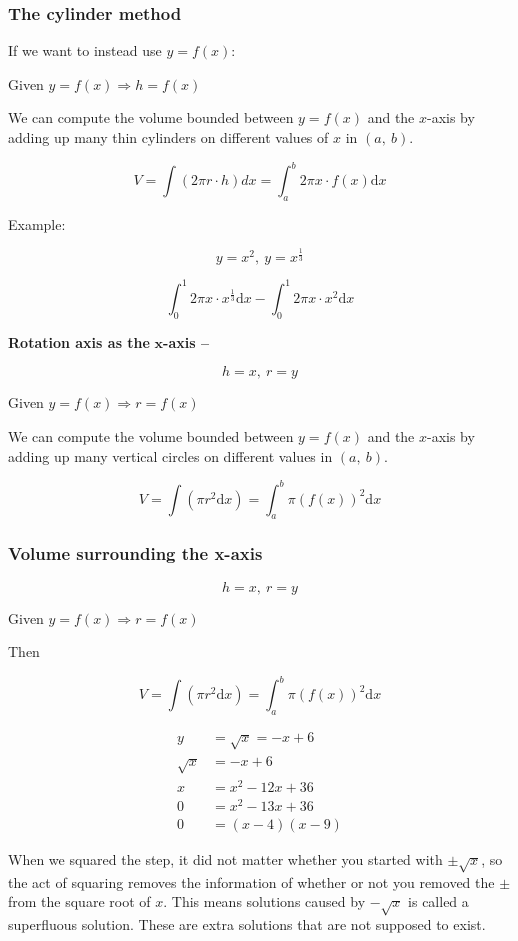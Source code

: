\documentclass[12pt]{article}
\theoremstyle{plain}
\theoremstyle{remark}
\theoremstyle{definition}
\begin{document}
\subsubsection{The cylinder method}


If we want to instead use \(y = f(x)\):

Given \(y = f(x) \Rightarrow h = f(x)\)

We can compute the volume bounded between \(y = f(x)\) and the
\(x\)-axis by adding up many thin cylinders on different values of \(x\)
in \((a,\ b)\).

\[V = \int(2\pi r \cdot h)dx = \int_{a}^{b}{2\pi x \cdot f(x)\text{d}x}\]

Example:



\[y = x^{2},\ y = x^{\frac{1}{3}}\]

\[\int_{0}^{1}{2\pi x \cdot x^{\frac{1}{3}}\text{d}x} - \int_{0}^{1}{2\pi x \cdot x^{2}\text{d}x}\]

\textbf{Rotation axis as the} \(\mathbf{x}\)\textbf{-axis --}

\[h = x,\ r = y\]

Given \(y = f(x) \Rightarrow r = f(x)\)

We can compute the volume bounded between \(y = f(x)\) and the
\(x\)-axis by adding up many vertical circles on different values in
\((a,\ b)\).

\[V = \int\left( \pi r^{2}\text{d}x \right) = \int_{a}^{b}{\pi\left( f(x) \right)^{2}\text{d}x}\]


\subsubsection{Volume surrounding the
x-axis}

\[h = x,\ r = y\]

Given \(y = f(x) \Rightarrow r = f(x)\)

Then

\[V = \int\left( \pi r^{2}\text{d}x \right) = \int_{a}^{b}{\pi\left( f(x) \right)^{2}\text{d}x}\]


\begin{align*}
y &= \sqrt{x} = - x + 6 \\
\sqrt{x} &= - x + 6 \\
x &= x^{2} - 12x + 36 \\
0 &= x^{2} - 13x + 36 \\
0 &= (x - 4)(x - 9)
\end{align*}


When we squared the step, it did not matter whether you started with
\(\pm \sqrt{x}\), so the act of squaring removes the information of
whether or not you removed the \(\pm\) from the square root of \(x\).
This means solutions caused by \(- \sqrt{x}\) is called a superfluous
solution. These are extra solutions that are not supposed to exist.
\end{document}
